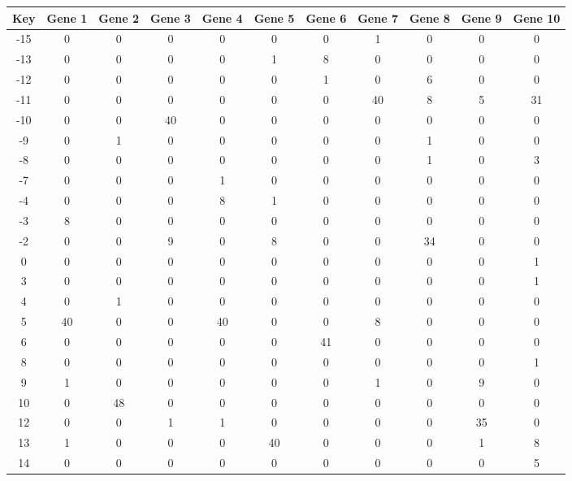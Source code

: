 \begin{tabular}{|c|c|c|c|c|c|c|c|c|c|c|}
\hline
Key & Gene 1 & Gene 2 & Gene 3 & Gene 4 & Gene 5 & Gene 6 & Gene 7 & Gene 8 & Gene 9 & Gene 10 \\
\hline
-15 & 0 & 0 & 0 & 0 & 0 & 0 & 1 & 0 & 0 & 0 \\
-13 & 0 & 0 & 0 & 0 & 1 & 8 & 0 & 0 & 0 & 0 \\
-12 & 0 & 0 & 0 & 0 & 0 & 1 & 0 & 6 & 0 & 0 \\
-11 & 0 & 0 & 0 & 0 & 0 & 0 & 40 & 8 & 5 & 31 \\
-10 & 0 & 0 & 40 & 0 & 0 & 0 & 0 & 0 & 0 & 0 \\
-9 & 0 & 1 & 0 & 0 & 0 & 0 & 0 & 1 & 0 & 0 \\
-8 & 0 & 0 & 0 & 0 & 0 & 0 & 0 & 1 & 0 & 3 \\
-7 & 0 & 0 & 0 & 1 & 0 & 0 & 0 & 0 & 0 & 0 \\
-4 & 0 & 0 & 0 & 8 & 1 & 0 & 0 & 0 & 0 & 0 \\
-3 & 8 & 0 & 0 & 0 & 0 & 0 & 0 & 0 & 0 & 0 \\
-2 & 0 & 0 & 9 & 0 & 8 & 0 & 0 & 34 & 0 & 0 \\
0 & 0 & 0 & 0 & 0 & 0 & 0 & 0 & 0 & 0 & 1 \\
3 & 0 & 0 & 0 & 0 & 0 & 0 & 0 & 0 & 0 & 1 \\
4 & 0 & 1 & 0 & 0 & 0 & 0 & 0 & 0 & 0 & 0 \\
5 & 40 & 0 & 0 & 40 & 0 & 0 & 8 & 0 & 0 & 0 \\
6 & 0 & 0 & 0 & 0 & 0 & 41 & 0 & 0 & 0 & 0 \\
8 & 0 & 0 & 0 & 0 & 0 & 0 & 0 & 0 & 0 & 1 \\
9 & 1 & 0 & 0 & 0 & 0 & 0 & 1 & 0 & 9 & 0 \\
10 & 0 & 48 & 0 & 0 & 0 & 0 & 0 & 0 & 0 & 0 \\
12 & 0 & 0 & 1 & 1 & 0 & 0 & 0 & 0 & 35 & 0 \\
13 & 1 & 0 & 0 & 0 & 40 & 0 & 0 & 0 & 1 & 8 \\
14 & 0 & 0 & 0 & 0 & 0 & 0 & 0 & 0 & 0 & 5 \\
\hline
\end{tabular}
